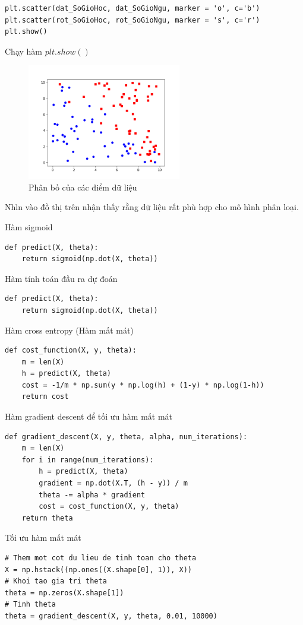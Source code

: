 \documentclass[12pt]{article}
\begin{document}
{{\begin{lstlisting}
plt.scatter(dat_SoGioHoc, dat_SoGioNgu, marker = 'o', c='b')
plt.scatter(rot_SoGioHoc, rot_SoGioNgu, marker = 's', c='r')
plt.show()
\end{lstlisting}
\noindent Chạy hàm $plt.show()$
\begin{figure}[htbp]
  \centering
  \includegraphics[width=0.6\textwidth]{image/Figure1.png}
  \caption{Phân bố của các điểm dữ liệu}
  \label{fig:myimage}
\end{figure}

\noindent Nhìn vào đồ thị trên nhận thấy rằng dữ liệu rất phù hợp cho mô hình phân loại.

\noindent Hàm sigmoid
\begin{lstlisting}
def predict(X, theta):
    return sigmoid(np.dot(X, theta))
\end{lstlisting}

\noindent Hàm tính toán đầu ra dự đoán
\begin{lstlisting}
def predict(X, theta):
    return sigmoid(np.dot(X, theta))
\end{lstlisting}

\noindent Hàm cross entropy (Hàm mất mát)
\begin{lstlisting}
def cost_function(X, y, theta):
    m = len(X)
    h = predict(X, theta)
    cost = -1/m * np.sum(y * np.log(h) + (1-y) * np.log(1-h))
    return cost
\end{lstlisting}

\noindent Hàm gradient descent để tối ưu hàm mất mát
\begin{lstlisting}
def gradient_descent(X, y, theta, alpha, num_iterations):
    m = len(X)
    for i in range(num_iterations):
        h = predict(X, theta)
        gradient = np.dot(X.T, (h - y)) / m
        theta -= alpha * gradient
        cost = cost_function(X, y, theta)
    return theta
\end{lstlisting}

\noindent Tối ưu hàm mất mát
\begin{lstlisting}
# Them mot cot du lieu de tinh toan cho theta
X = np.hstack((np.ones((X.shape[0], 1)), X))
# Khoi tao gia tri theta
theta = np.zeros(X.shape[1])
# Tinh theta
theta = gradient_descent(X, y, theta, 0.01, 10000)
\end{lstlisting}

}}
\end{document}
